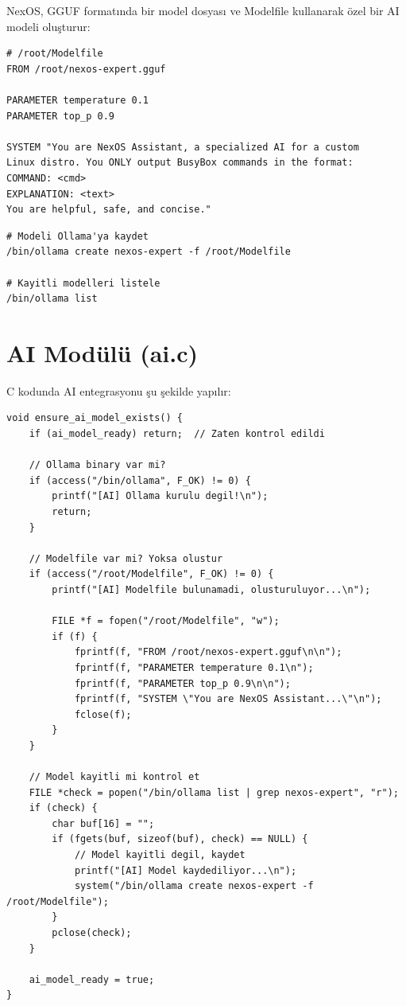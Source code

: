 \documentclass[12pt,a4paper]{report}
\begin{document}
NexOS, GGUF formatında bir model dosyası ve Modelfile kullanarak özel bir AI modeli oluşturur:

\begin{lstlisting}[style=bashstyle,caption={Modelfile Icerigi}]
# /root/Modelfile
FROM /root/nexos-expert.gguf

PARAMETER temperature 0.1
PARAMETER top_p 0.9

SYSTEM "You are NexOS Assistant, a specialized AI for a custom 
Linux distro. You ONLY output BusyBox commands in the format: 
COMMAND: <cmd>
EXPLANATION: <text>
You are helpful, safe, and concise."
\end{lstlisting}

\begin{lstlisting}[style=bashstyle,caption={Model Kayit Islemi}]
# Modeli Ollama'ya kaydet
/bin/ollama create nexos-expert -f /root/Modelfile

# Kayitli modelleri listele
/bin/ollama list
\end{lstlisting}

\section{AI Modülü (ai.c)}

C kodunda AI entegrasyonu şu şekilde yapılır:

\begin{lstlisting}[caption={AI Model Kontrolu}]
void ensure_ai_model_exists() {
    if (ai_model_ready) return;  // Zaten kontrol edildi
    
    // Ollama binary var mi?
    if (access("/bin/ollama", F_OK) != 0) {
        printf("[AI] Ollama kurulu degil!\n");
        return;
    }
    
    // Modelfile var mi? Yoksa olustur
    if (access("/root/Modelfile", F_OK) != 0) {
        printf("[AI] Modelfile bulunamadi, olusturuluyor...\n");
        
        FILE *f = fopen("/root/Modelfile", "w");
        if (f) {
            fprintf(f, "FROM /root/nexos-expert.gguf\n\n");
            fprintf(f, "PARAMETER temperature 0.1\n");
            fprintf(f, "PARAMETER top_p 0.9\n\n");
            fprintf(f, "SYSTEM \"You are NexOS Assistant...\"\n");
            fclose(f);
        }
    }
    
    // Model kayitli mi kontrol et
    FILE *check = popen("/bin/ollama list | grep nexos-expert", "r");
    if (check) {
        char buf[16] = "";
        if (fgets(buf, sizeof(buf), check) == NULL) {
            // Model kayitli degil, kaydet
            printf("[AI] Model kaydediliyor...\n");
            system("/bin/ollama create nexos-expert -f /root/Modelfile");
        }
        pclose(check);
    }
    
    ai_model_ready = true;
}
\end{lstlisting}
\end{document}

